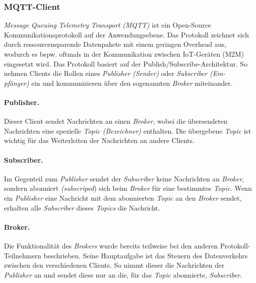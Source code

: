 \pagebreak

\subsubsection{MQTT-Client}
\textit{Message Queuing Telemetry Transport (MQTT)} ist ein Open-Source Kommunikationsprotokoll auf der
Anwendungsebene. Das Protokoll zeichnet sich durch ressourcensparende Datenpakete mit einem 
geringen Overhead aus, wodurch es bspw. oftmals in der Kommunikation zwischen IoT-Geräten (M2M) 
eingesetzt wird. Das Protokoll basiert auf der Publish/Subscribe-Architektur. So nehmen Clients
die Rollen eines \textit{Publisher (Sender)} oder \textit{Subscriber (Em- pfänger)} ein und kommunizieren
über den sogenannten \textit{Broker} miteinander. \cite{mqtt, wong20man}

\paragraph{Publisher.} 
Dieser Client sendet Nachrichten an einen \textit{Broker}, wobei die übersendeten Nachrichten eine spezielle
\textit{Topic (Bezeichner)} enthalten. Die übergebene \textit{Topic} ist wichtig für das Weiterleiten der
Nachrichten an andere Clients. \cite{mqtt, wong20man}


\paragraph{Subscriber.} 
Im Gegenteil zum \textit{Publisher} sendet der \textit{Subscriber} keine Nachrichten an \textit{Broker},
sondern abonniert \textit{(subscriped}) sich beim \textit{Broker} für eine bestimmtes \textit{Topic}. 
Wenn ein \textit{Publisher} eine Nachricht mit dem abonnierten \textit{Topic} an den \textit{Broker}
sendet, erhalten alle \textit{Subscriber} dieses \textit{Topics} die Nachricht. \cite{mqtt, wong20man}


\paragraph{Broker.} 
Die Funktionalität des \textit{Brokers} wurde bereits teilweise bei den anderen Protokoll-Teilnehmern 
beschrieben. Seine Hauptaufgabe ist das Steuern des Datenverkehrs zwischen den verschiedenen Clients.
So nimmt dieser die Nachrichten der \textit{Publisher} an und sendet diese nur an die, für das \textit{Topic} 
abonnierte, \textit{Subscriber}. \cite{mqtt, wong20man} \\


